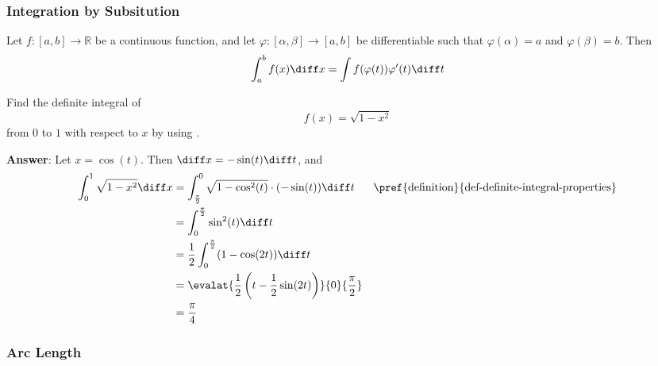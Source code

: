 \subsubsection{Integration by Subsitution}\label{subsubsec-integration-by-substitution-definite-integrals}

\begin{thm}\label{thm-integration-by-substitution-definite-integrals}
	Let $f:[a,b]\to\mathbb{R}$ be a continuous function, and let $\varphi:[\alpha,\beta]\to[a,b]$
	be differentiable such that $\varphi(\alpha)=a$ and $\varphi(\beta)=b$. Then
	\begin{equation}
		\int_a^b f(x) \diff x = \int f(\varphi(t))\varphi'(t) \diff t
	\end{equation}
\end{thm}

\begin{exm}\label{exm-integration-using-substitution-definite-integrals}
	Find the definite integral of
	\begin{equation*}
		f(x)=\sqrt{1-x^2}
	\end{equation*}
	from $0$ to $1$ with respect to $x$ by using .
	\begin{flushleft}
		\textbf{Answer}: Let $x=\cos(t)$. Then $\diff x = -\sin(t) \diff t$, and
		\begin{align*}
			\int_0^1 \sqrt{1-x^2} \diff x
			 & = \int_{\frac{\pi}{2}}^0 \sqrt{1-\cos^2(t)}\cdot(-\sin(t)) \diff t         &  & \text{\pref{definition}{def-definite-integral-properties}} \\
			 & = \int_0^{\frac{\pi}{2}} \sin^2(t) \diff t                                                                                                 \\
			 & = \frac{1}{2}\int_0^{\frac{\pi}{2}} (1-\cos(2t)) \diff t                                                                                   \\
			 & = \evalat{\frac{1}{2}\left(t-\frac{1}{2}\sin(2t)\right)}{0}{\frac{\pi}{2}}                                                                 \\
			 & = \frac{\pi}{4}
		\end{align*}
	\end{flushleft}
\end{exm}

\subsubsection{Arc Length}\label{subsubsec-arc-length}

